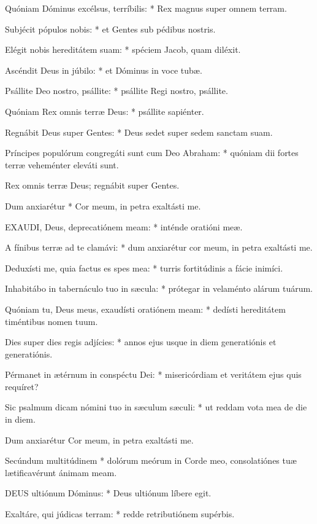 Quóniam Dóminus excélsus, terríbilis: * Rex magnus super omnem terram.

Subjécit pópulos nobis: * et Gentes sub pédibus nostris.

Elégit nobis hereditátem suam: * spéciem Jacob, quam diléxit.

Ascéndit Deus in júbilo: * et Dóminus in voce tubæ.

Psállite Deo nostro, psállite: * psállite Regi nostro, psállite.

Quóniam Rex omnis terræ Deus: * psállite sapiénter.

Regnábit Deus super Gentes: * Deus sedet super sedem sanctam suam.

Príncipes populórum congregáti sunt cum Deo Abraham: * quóniam dii fortes terræ veheménter eleváti sunt.

 Rex omnis terræ Deus; regnábit super Gentes.

 Dum anxiarétur * Cor meum, in petra exaltásti me.


\lettrine[lines=2]{E}{XAUDI}, Deus, deprecatiónem meam: * inténde oratióni meæ.

A fínibus terræ ad te clamávi: * dum anxiarétur cor meum, in petra exaltásti me.

Deduxísti me, quia factus es spes mea: * turris fortitúdinis a fácie inimíci.

Inhabitábo in tabernáculo tuo in sæcula: * prótegar in velaménto alárum tuárum.

Quóniam tu, Deus meus, exaudísti oratiónem meam: * dedísti hereditátem timéntibus nomen tuum.

Dies super dies regis adjícies: * annos ejus usque in diem generatiónis et generatiónis.

Pérmanet in ætérnum in conspéctu Dei: * misericórdiam et veritátem ejus quis requíret?

Sic psalmum dicam nómini tuo in sæculum sæculi: * ut reddam vota mea de die in diem.

 Dum anxiarétur Cor meum, in petra exaltásti me.

 Secúndum multitúdinem * dolórum meórum in Corde meo, consolatiónes tuæ lætificavérunt ánimam meam.


\lettrine[lines=2]{D}{EUS} ultiónum Dóminus: * Deus ultiónum líbere egit.

Exaltáre, qui júdicas terram: * redde retributiónem supérbis.

